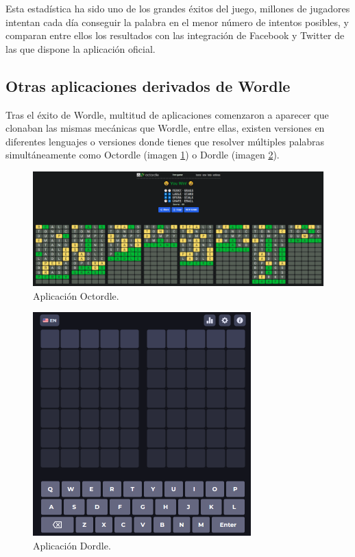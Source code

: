 Esta estadística ha sido uno de los grandes éxitos del juego, millones de jugadores intentan cada día conseguir la palabra en el menor número de intentos posibles, y comparan entre ellos los resultados con las integración de Facebook y Twitter de las que dispone la aplicación oficial.


\subsection{Otras aplicaciones derivados de Wordle}

Tras el éxito de Wordle, multitud de aplicaciones comenzaron a aparecer que clonaban las mismas mecánicas que Wordle, entre ellas, existen versiones en diferentes lenguajes o versiones donde tienes que resolver múltiples palabras simultáneamente como Octordle (imagen \ref{fig:octordle_app}) o Dordle (imagen \ref{fig:dordle_app}).


\begin{figure}
	\centering
	\includegraphics[clip=true,width=\textwidth]{images/octordle.png}
	\caption{Aplicación Octordle.}
	\label{fig:octordle_app}
\end{figure}

\begin{figure}
	\centering
	\includegraphics[clip=true,width=0.75\textwidth]{images/dordle.png}
	\caption{Aplicación Dordle.}
	\label{fig:dordle_app}
\end{figure}


